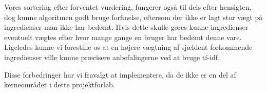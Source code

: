Vores sortering efter forventet vurdering, fungerer også til dels efter hensigten, dog kunne algoritmen godt bruge forfinelse, eftersom der ikke er lagt stor vægt på ingredienser man ikke har bedømt.
Hvis dette skulle gøres kunne ingredienser eventuelt vægtes efter hvor mange gange en bruger har bedømt denne vare.
Ligeledes kunne vi forestille os at en højere vægtning af sjældent forkommende ingredienser ville kunne præcisere anbefalingerne ved at bruge tf-idf.

Disse forbedringer har vi fravalgt at implementere, da de ikke er en del af kerneområdet i dette projektforløb.
